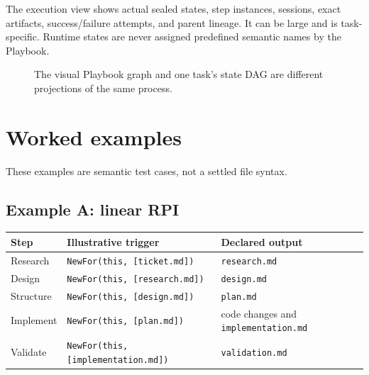 \documentclass[11pt]{article}
\newcommand{\artifact}[1]{\texttt{#1}}
\begin{document}
The execution view shows actual sealed states, step instances, sessions, exact artifacts, success/failure attempts, and parent lineage. It can be large and is task-specific. Runtime states are never assigned predefined semantic names by the Playbook.

\begin{figure}[ht]
\centering
{}
\caption{The visual Playbook graph and one task's state DAG are different projections of the same process.}
\end{figure}

\section{Worked examples}

These examples are semantic test cases, not a settled file syntax.

\subsection{Example A: linear RPI}

\begin{tabularx}{\textwidth}{@{}L{1.15in}L{2.75in}Y@{}}
\toprule
\textbf{Step} & \textbf{Illustrative trigger} & \textbf{Declared output} \\
\midrule
Research & \texttt{NewFor(this, [ticket.md])} & \artifact{research.md} \\
Design & \texttt{NewFor(this, [research.md])} & \artifact{design.md} \\
Structure & \texttt{NewFor(this, [design.md])} & \artifact{plan.md} \\
Implement & \texttt{NewFor(this, [plan.md])} & code changes and \artifact{implementation.md} \\
Validate & \texttt{NewFor(this, [implementation.md])} & \artifact{validation.md} \\
\bottomrule
\end{tabularx}
\end{document}
